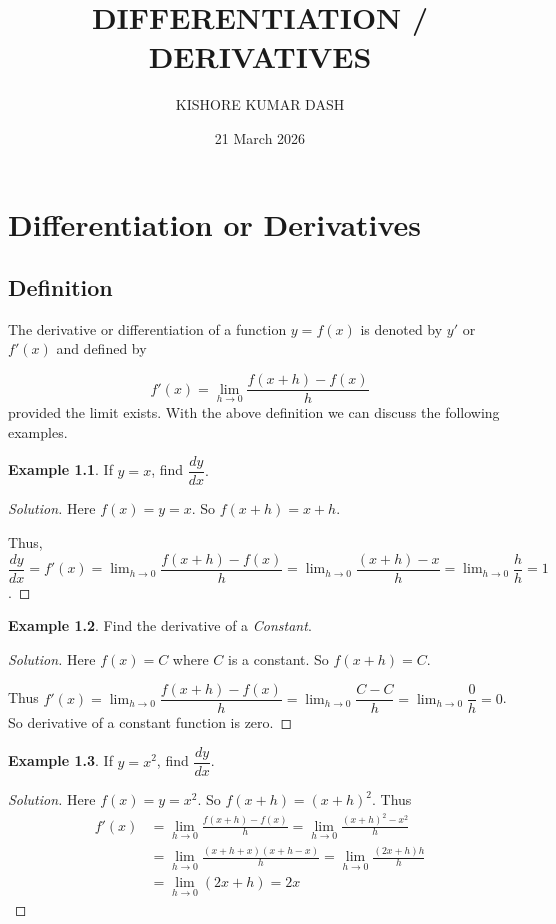 \documentclass[../../main.tex]{subfiles}
\title{DIFFERENTIATION / DERIVATIVES}
\author{KISHORE KUMAR DASH}
\date{21 March 2026}
\theoremstyle{definition}
\newtheorem{example}{Example}[section]
\newenvironment{solution}
    {\begin{proof}[Solution]}
    {\end{proof}}
\begin{document}
\chapter{Differentiation or Derivatives}

\section{Definition}


The derivative or differentiation of a function $y = f(x)$ is denoted by $y'$ or $f'(x)$ and defined by    

\[
f'(x)= \lim_{h \rightarrow 0} \frac {f(x+h)-f(x)}{h}
\]
provided the limit exists. With the above definition we can discuss the following examples.

\begin{example}
If $y=x$, find $\dfrac{dy}{dx}.$    
\end{example}

\begin{solution}
Here $f(x)=y=x.$ So $f(x+h)=x+h.$

Thus, $\dfrac{dy}{dx} = f'(x) = \lim_{h \rightarrow 0} \dfrac {f(x+h)-f(x)}{h} =
 \lim_{h \rightarrow 0} \dfrac {(x+h)-x}{h} = \lim_{h \rightarrow 0} \dfrac {h}{h} = 1$.    
\end{solution}

\begin{example}
Find the derivative of a \textit{Constant}.    
\end{example}

\begin{solution}
Here $f(x)=C$ where $C$ is a constant. So $f(x+h)= C$.

Thus $f'(x) = \lim_{h \rightarrow 0} \dfrac {f(x+h)-f(x)}{h} = \lim_{h \rightarrow 0} \dfrac {C-C}{h} = \lim_{h \rightarrow 0} \dfrac {0}{h} = 0$. So derivative of a constant function is zero.    
\end{solution}

\begin{example}
If $y=x^2$, find $\dfrac{dy}{dx}$.    
\end{example}

\begin{solution}
Here $f(x)=y=x^2.$ So $f(x+h)=(x+h)^2$. Thus
\begin{align*}
f'(x) &= \lim_{h \rightarrow 0} \frac {f(x+h)-f(x)}{h} = \lim_{h \rightarrow 0} \frac {(x+h)^2-x^2}{h} \\
&= \lim_{h \rightarrow 0} \frac {(x+h+x)(x+h-x)}{h} = \lim_{h \rightarrow 0} \frac {(2x+h)h}{h} \\
&= \lim_{h \rightarrow 0}(2x+h) = 2x
\end{align*}    
\end{solution}
\end{document}
